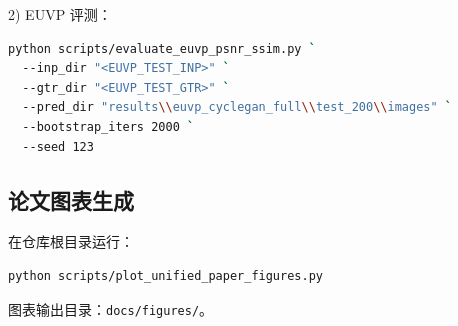 \documentclass[a4paper,zihao=-4,linespread=1.25]{ctexart}
\begin{document}
2) EUVP 评测：
\begin{lstlisting}[language=bash]
python scripts/evaluate_euvp_psnr_ssim.py `
  --inp_dir "<EUVP_TEST_INP>" `
  --gtr_dir "<EUVP_TEST_GTR>" `
  --pred_dir "results\\euvp_cyclegan_full\\test_200\\images" `
  --bootstrap_iters 2000 `
  --seed 123
\end{lstlisting}

\subsection{论文图表生成}
在仓库根目录运行：
\begin{lstlisting}[language=bash]
python scripts/plot_unified_paper_figures.py
\end{lstlisting}
图表输出目录：\texttt{docs/figures/}。
\end{document}
